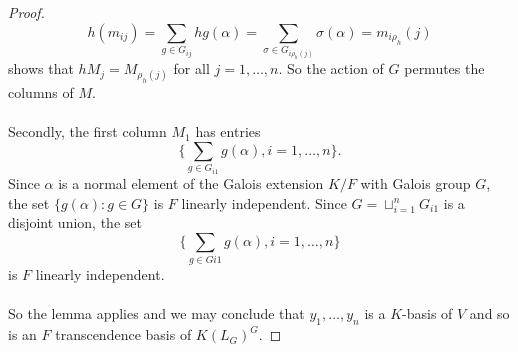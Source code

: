 \documentclass{article}
\theoremstyle{plain}
\theoremstyle{definition}
\begin{document}
\begin{proof}
$$h(m_{ij}) = \sum_{g \in G_{ij}}hg(\alpha) = \sum_{\sigma \in G_{i \rho_{h}(j)}}\sigma (\alpha) = m_{i \rho_{h}}(j)$$
shows that $hM_j = M_{\rho_h(j)}$ for all $j = 1, \ldots, n$. So the action of $G$ permutes the columns of $M$. \\
\\
Secondly, the first column $M_1$ has entries 
$$\lbrace\sum_{g \in G_{i1}}g(\alpha), i = 1, \ldots,n\rbrace.$$
Since $\alpha$ is a normal element of the Galois extension $K/F$ with Galois group $G$, the set $\lbrace g(\alpha): g \in G \rbrace$ is $F$ linearly independent. Since $G = \sqcup^n_{i =1}G_{i1}$ is a disjoint union, the set 
$$\lbrace \sum_{g \in G{i1}}g(\alpha), i = 1, \ldots, n \rbrace$$
is $F$ linearly independent.\\
\\
So the lemma applies and we may conclude that $y_1, \ldots, y_n$ is a $K$-basis of $V$ and so is an $F$ transcendence basis of $K(L_G)^G$.

\end{proof}
\end{document}
